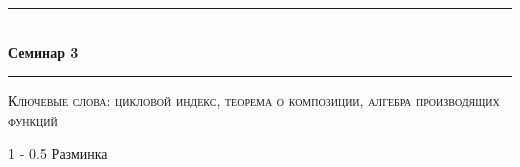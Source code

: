 \documentclass{article}
\makeatletter
\def \topic {Семинар 3}
\theoremstyle{definition}
\renewcommand{\section}{\@startsection
{section}%
{1}%
{\z@}%
{-\baselineskip}%
{0.5\baselineskip}%
{\centering\large\scshape}} %
\makeatother
\begin{document}
\begin{center}

\newcommand{\HRule}{\rule{\linewidth}{0.5mm}}
\HRule \\[0.2cm]
{ \Large \bfseries \topic} %
\HRule

\end{center}

\textsc{Ключевые слова: 
цикловой индекс, теорема о композиции, алгебра производящих функций}


% 

%
%

\section{Разминка}
\end{document}
